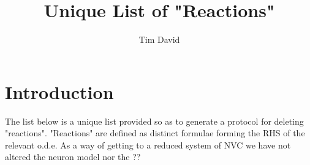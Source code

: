 \documentclass[]{article}
\title{Unique List of "Reactions" }
\author{Tim David }
\begin{document}
\maketitle

\begin{abstract}

\end{abstract}

\section{Introduction}
The list below is a unique list provided so as to generate a protocol for deleting "reactions". "Reactions" are defined as distinct formulae forming the RHS of the relevant o.d.e. 
As a way of getting to a reduced system of NVC we have  not altered the neuron model nor the ?? 
\end{document}
